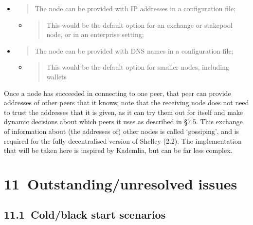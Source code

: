 \documentclass[]{article}
\begin{document}
\begin{itemize}
\item
  \begin{quote}
  The node can be provided with IP addresses in a configuration file;
  \end{quote}

  \begin{itemize}
  \item
    \begin{quote}
    This would be the default option for an exchange or stakepool node,
    or in an enterprise setting;
    \end{quote}
  \end{itemize}
\item
  \begin{quote}
  The node can be provided with DNS names in a configuration file;
  \end{quote}

  \begin{itemize}
  \item
    \begin{quote}
    This would be the default option for smaller nodes, including
    wallets
    \end{quote}
  \end{itemize}
\end{itemize}

Once a node has succeeded in connecting to one peer, that peer can
provide addresses of other peers that it knows; note that the receiving
node does not need to trust the addresses that it is given, as it can
try them out for itself and make dynamic decisions about which peers it
uses as described in §7.5. This exchange of information about (the
addresses of) other nodes is called `gossiping', and is required for the
fully decentralised version of Shelley (2.2). The implementation that
will be taken here is inspired by Kademlia, but can be far less complex.

\hypertarget{outstandingunresolved-issues}{%
\section{​11​~Outstanding/unresolved
issues}\label{outstandingunresolved-issues}}

\hypertarget{coldblack-start-scenarios}{%
\subsection{​11.1​~Cold/black start
scenarios}\label{coldblack-start-scenarios}}
\end{document}
